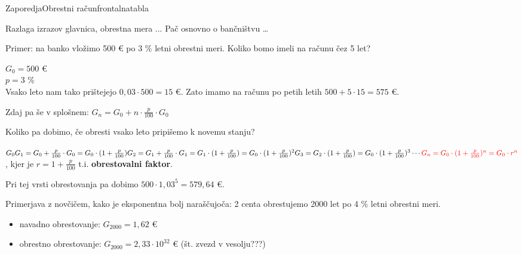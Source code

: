 \begin{priprava}{}{}{Zaporedja}{Obrestni račun}{frontalna}{tabla}


Razlaga izrazov glavnica, obrestna mera ... Pač osnovno o bančništvu \dots


Primer: na banko vložimo 500 €  po 3 \% letni obrestni meri. Koliko bomo imeli na računu čez 5 let?

$ G_0 = 500 $  € \\
$ p = 3 $ \%  \\
Vsako leto nam tako prištejejo $ 0,03 \cdot 500 = 15 $ €. Zato imamo na računu po petih letih $ 500 + 5 \cdot 15 = 575 $ €.

Zdaj pa še v splošnem: \textcolor{rdeca}{$ G_n = G_0 + n \cdot \frac{p}{100} \cdot G_0 $}


Koliko pa dobimo, če obresti vsako leto pripišemo k novemu stanju? 

$ G_0 \\
G_1 = G_0 + \frac{p}{100} \cdot G_0 = G_0 \cdot (1 + \frac{p}{100}) \\
G_2 = G_1 + \frac{p}{100} \cdot G_1 = G_1 \cdot (1 + \frac{p}{100}) = G_0 \cdot (1 + \frac{p}{100})^2 \\
G_3 = G_2 \cdot (1 + \frac{p}{100}) = G_0 \cdot (1 + \frac{p}{100})^3 \\
\cdots \\
\textcolor{rdeca}{G_n = G_0 \cdot (1 + \frac{p}{100})^n = G_0 \cdot r^n} $, kjer je $ r = 1 + \frac{p}{100} $ t.i. \textbf{obrestovalni faktor}.

Pri tej vrsti obrestovanja pa dobimo $ 500 \cdot 1,03^5 = 579,64 $ €. 

Primerjava z novčičem, kako je eksponentna bolj naraščujoča: 2 centa obrestujemo 2000 let po 4 \% letni obrestni meri.
\begin{itemize}
    \item navadno obrestovanje: $ G_2000 = 1,62 $ €
    \item obrestno obrestovanje: $ G_2000 = 2,33 \cdot 10^32 $ € (št. zvezd v vesolju???)
\end{itemize}


\end{priprava}
